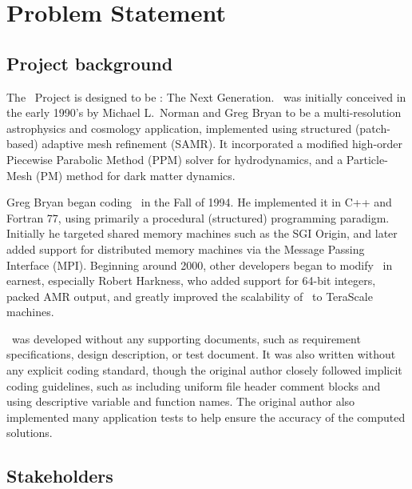 \documentclass[12pt]{article}
\begin{document}

\section{Problem Statement}
\subsection{Project background}


    The \cello\ Project is designed to be \enzo: The Next Generation.
    \enzo\ was initially conceived in the early 1990's by Michael
    L.~Norman and Greg Bryan to be a multi-resolution astrophysics and
    cosmology application, implemented using structured (patch-based)
    adaptive mesh refinement (SAMR).  It incorporated a modified
    high-order Piecewise Parabolic Method (PPM) solver for
    hydrodynamics, and a Particle-Mesh (PM) method for dark matter
    dynamics.

    Greg Bryan began coding \enzo\ in the Fall of 1994.  He
    implemented it in C++ and Fortran 77, using primarily a procedural
    (structured) programming paradigm.  Initially he targeted shared
    memory machines such as the SGI Origin, and later added support
    for distributed memory machines via the Message Passing Interface
    (MPI).  Beginning around 2000, other developers began to modify
    \enzo\ in earnest, especially Robert Harkness, who added support
    for 64-bit integers, packed AMR output, and greatly improved
    the scalability of \enzo\ to TeraScale machines.

    \enzo\ was developed without any supporting documents, such as
    requirement specifications, design description, or test document.
    It was also written without any explicit coding standard, though
    the original author closely followed implicit coding guidelines,
    such as including uniform file header comment blocks and using
    descriptive variable and function names.  The original author also
    implemented many application tests to help ensure the accuracy
    of the computed solutions.

\subsection{Stakeholders}
\end{document}
